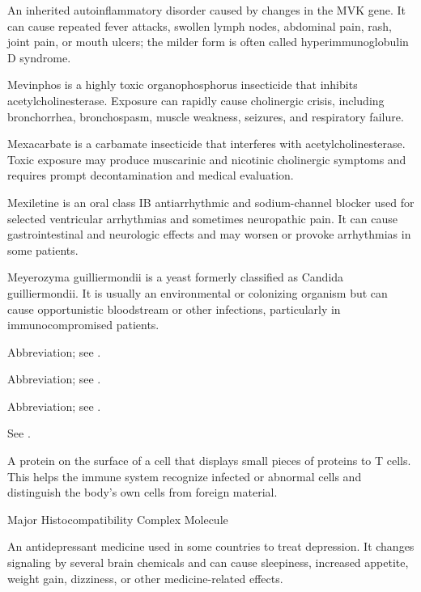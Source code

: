  An inherited autoinflammatory disorder caused by changes in the MVK gene. It can cause repeated fever attacks, swollen lymph nodes, abdominal pain, rash, joint pain, or mouth ulcers; the milder form is often called hyperimmunoglobulin D syndrome.

 Mevinphos is a highly toxic organophosphorus insecticide that inhibits acetylcholinesterase. Exposure can rapidly cause cholinergic crisis, including bronchorrhea, bronchospasm, muscle weakness, seizures, and respiratory failure.

 Mexacarbate is a carbamate insecticide that interferes with acetylcholinesterase. Toxic exposure may produce muscarinic and nicotinic cholinergic symptoms and requires prompt decontamination and medical evaluation.

 Mexiletine is an oral class IB antiarrhythmic and sodium-channel blocker used for selected ventricular arrhythmias and sometimes neuropathic pain. It can cause gastrointestinal and neurologic effects and may worsen or provoke arrhythmias in some patients.

 Meyerozyma guilliermondii is a yeast formerly classified as Candida guilliermondii. It is usually an environmental or colonizing organism but can cause opportunistic bloodstream or other infections, particularly in immunocompromised patients.

 Abbreviation; see .

 Abbreviation; see .

 Abbreviation; see .

 See .

 A protein on the surface of a cell that displays small pieces of proteins to T cells. This helps the immune system recognize infected or abnormal cells and distinguish the body's own cells from foreign material.

\synonyms
Major Histocompatibility Complex Molecule

 An antidepressant medicine used in some countries to treat depression. It changes signaling by several brain chemicals and can cause sleepiness, increased appetite, weight gain, dizziness, or other medicine-related effects.

